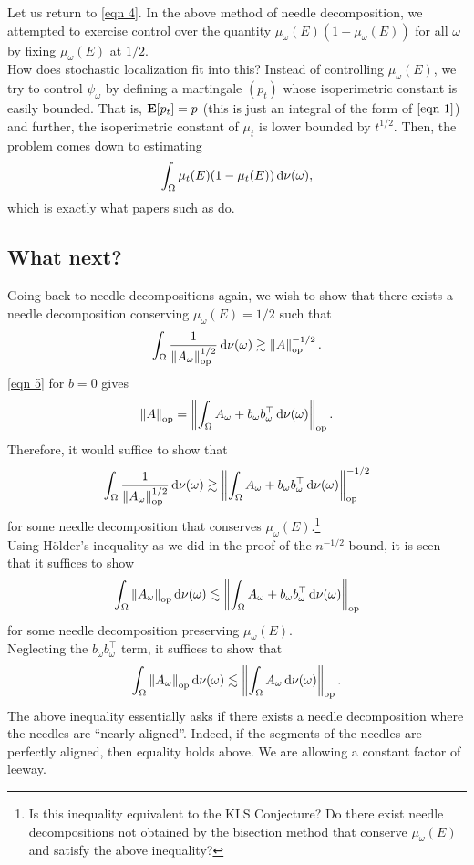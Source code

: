 \documentclass{article}
\begin{document}
Let us return to \eqref{eqn 4}. In the above method of needle decomposition, we attempted to exercise control over the quantity $\mu_\omega(E) ( 1 - \mu_\omega(E) )$ for all $\omega$ by fixing $\mu_\omega(E)$ at $1/2$.\\

How does stochastic localization fit into this? Instead of controlling $\mu_\omega(E)$, we try to control $\psi_\omega$ by defining a martingale $(p_t)$ whose isoperimetric constant is easily bounded. That is, $\textbf{E}[p_t] = p$ (this is just an integral of the form of $\eqref{eqn 1}$) and further, the isoperimetric constant of $\mu_t$ is lower bounded by $t^{1/2}$. Then, the problem comes down to estimating
\[ \int_\Omega \mu_t(E) ( 1 - \mu_t(E) ) \operatorname{d}\!{\nu(\omega)}, \]
which is exactly what papers such as \cite{chen2021constant} do.

\subsection{What next?}

Going back to needle decompositions again, we wish to show that there exists a needle decomposition conserving $\mu_\omega(E) = 1/2$ such that
\[ \int_{\Omega} \frac{1}{\left\lVert A_\omega\right\rVert_{\text{op}}^{1/2}} \operatorname{d}\!{\nu(\omega)} \gtrsim \left\lVert A\right\rVert_{\text{op}}^{-1/2}. \]
\eqref{eqn 5} for $b = 0$ gives
\[ \left\lVert A\right\rVert_{\text{op}} = \left\lVert\int_{\Omega} A_\omega + b_\omega b_\omega^\top \operatorname{d}\!{\nu(\omega)} \right\rVert_{\text{op}}. \]
Therefore, it would suffice to show that
\[ \int_\Omega \frac{1}{\left\lVert A_\omega\right\rVert_{\text{op}}^{1/2}} \operatorname{d}\!{\nu(\omega)} \gtrsim \left\lVert\int_{\Omega} A_\omega + b_\omega b_\omega^\top \operatorname{d}\!{\nu(\omega)} \right\rVert_{\text{op}}^{-1/2} \]
for some needle decomposition that conserves $\mu_\omega(E)$.\footnote{Is this inequality equivalent to the KLS Conjecture? Do there exist needle decompositions not obtained by the bisection method that conserve $\mu_\omega(E)$ and satisfy the above inequality?}\\

Using H\"{o}lder's inequality as we did in the proof of the $n^{-1/2}$ bound, it is seen that it suffices to show
\[ \int_\Omega \left\lVert A_\omega\right\rVert_{\text{op}} \operatorname{d}\!{\nu(\omega)} \lesssim \left\lVert \int_\Omega A_\omega + b_\omega b_\omega^\top \operatorname{d}\!{\nu(\omega)} \right\rVert_{\text{op}} \]
for some needle decomposition preserving $\mu_\omega(E)$.\\
Neglecting the $b_\omega b_\omega^\top$ term, it suffices to show that
\[ \int_\Omega \left\lVert A_\omega\right\rVert_{\text{op}} \operatorname{d}\!{\nu(\omega)} \lesssim \left\lVert \int_\Omega A_\omega \operatorname{d}\!{\nu(\omega)} \right\rVert_{\text{op}}. \]
The above inequality essentially asks if there exists a needle decomposition where the needles are ``nearly aligned''. Indeed, if the segments of the needles are perfectly aligned, then equality holds above. We are allowing a constant factor of leeway.



\end{document}
